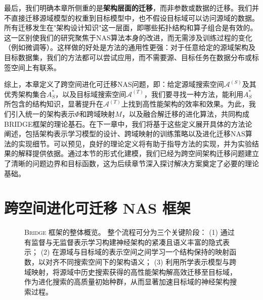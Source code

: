 \documentclass[../main.tex]{subfiles}
\begin{document}
最后，我们明确本章所侧重的是\textbf{架构层面的迁移}，而非参数或数据的迁移。我们并不直接迁移源域模型的权重到目标模型中，也不假设目标域可以访问源域的数据。所有迁移发生在"架构设计知识"这一层面，即哪些拓扑结构和算子组合是有效的。这一区别使我们的研究聚焦于NAS算法本身的改进，而无需涉及训练过程的变化（例如微调等）。这样做的好处是方法的通用性更强：对于任意给定的源域架构及目标数据集，我们的方法都可以尝试应用，而不需要源、目标任务在数据分布或标签空间上有联系。

综上，本章定义了跨空间进化可迁移NAS问题，即：给定源域搜索空间$\mathcal{A}^{(S)}$及其优秀架构集合$A^*_S$，以及目标域搜索空间$\mathcal{A}^{(T)}$，我们要寻找一种方法，能利用$A^*_S$所包含的结构知识，显著提升在$\mathcal{A}^{(T)}$上找到高性能架构的效率和效果。为此，我们引入统一的架构表示$\Phi$和跨域映射$M$，以及融合解迁移的进化算法，共同构成BRIDGE框架的理论基石。在下一章中，我们将基于这些定义展开具体的方法论阐述，包括架构表示学习模型的设计、跨域映射的训练策略以及进化迁移NAS算法的实现细节。可以预见，良好的理论定义将有助于指导方法的实现，并为实验结果的解释提供依据。通过本节的形式化建模，我们已经为跨空间架构迁移问题建立了清晰的问题边界和目标函数，这为后续章节深入探讨解决方案奠定了必要的理论基础。

\section[\hspace{-2pt}跨空间进化可迁移 NAS 框架]{\heiti{}\hspace{-8pt}跨空间进化可迁移 NAS 框架}

\begin{figure}[htbp]
	\centering
	\caption{
		\textsc{Bridge} 框架的整体概览。
		整个流程可分为三个关键阶段：
		(1) 通过有监督与无监督表示学习构建神经架构的紧凑且语义丰富的隐式表示；
		(2) 在源域与目标域的表示空间之间学习一个结构保持的映射函数，以对齐不同搜索空间下的架构语义；
		(3) 利用所学表示模型与跨域映射，将源域中历史搜索获得的高性能架构解高效迁移至目标域，作为进化搜索的高质量初始种群，从而显著加速目标域的神经架构搜索过程。
	}\label{fig:overview}
\end{figure}
\end{document}
